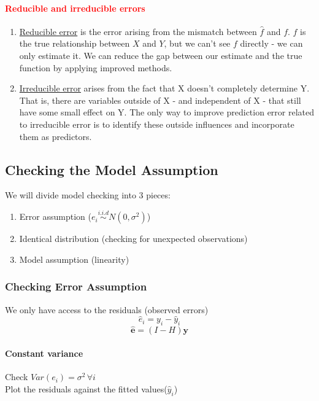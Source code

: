 \documentclass[11pt]{article}
\newcommand{\tb}[1]{\textbf{#1}}
\newcommand{\under}[1]{\underline{#1}}
\newcommand{\vy}[0]{\tb{y}}
\newcommand{\ve}[0]{\tb{e}}
\begin{document}
\paragraph{\textcolor{red}{Reducible and irreducible errors}}
\begin{enumerate}
	\item \under{Reducible error} is the error arising from the mismatch between $\hat{f}$ and $f$. $f$ is the true relationship between $X$ and $Y$, but we can't see $f$ directly - we can only estimate it. We can reduce the gap between our estimate and the true function by applying improved methods.
	\item \under{Irreducible error} arises from the fact that X doesn't completely determine Y. That is, there are variables outside of X - and independent of X - that still have some small effect on Y. The only way to improve prediction error related to irreducible error is to identify these outside influences and incorporate them as predictors.
\end{enumerate}
\subsection{Checking the Model Assumption}
We will divide model checking into 3 pieces:
\begin{enumerate}
    \item Error assumption ($e_i \overset{i.i.d}{\sim} N(0,  \sigma^2)$)
    \item Identical distribution (checking for unexpected observations)
    \item Model assumption (linearity)
\end{enumerate}
\subsubsection{Checking Error Assumption}
We only have access to the residuals (observed errors)
$$\hat{e}_i = y_i - \hat{y}_i$$
$$\hat{\ve} = (I - H)\vy$$
\paragraph{Constant variance}
Check $Var(e_i) = \sigma^2 \, \forall i$\\
Plot the residuals against the fitted values($\hat{y}_i$)
\end{document}
